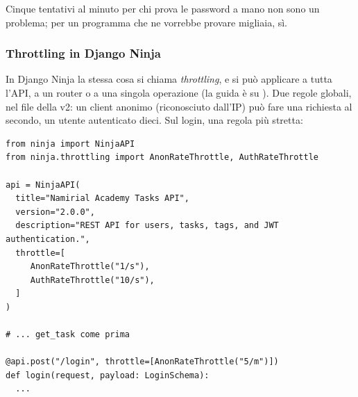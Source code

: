 Cinque tentativi al minuto per chi prova le password a mano non sono un
problema; per un programma che ne vorrebbe provare migliaia, sì.

\subsubsection{Throttling in Django Ninja}

In Django Ninja la stessa cosa si chiama \textit{throttling}, e si può
applicare a tutta l'API, a un router o a una singola operazione (la guida è su
). Due regole globali, nel
file della v2: un client anonimo (riconosciuto dall'IP) può fare una richiesta
al secondo, un utente autenticato dieci. Sul login, una regola più stretta:

\begin{affianco}[0.55]
\codicepiccolo
\begin{lstlisting}[style=python, name=tasks/api_v2.py]
from ninja import NinjaAPI
from ninja.throttling import AnonRateThrottle, AuthRateThrottle

api = NinjaAPI(
  title="Namirial Academy Tasks API",
  version="2.0.0",
  description="REST API for users, tasks, tags, and JWT authentication.",
  throttle=[
     AnonRateThrottle("1/s"),
     AuthRateThrottle("10/s"),
  ]
)

# ... get_task come prima

@api.post("/login", throttle=[AnonRateThrottle("5/m")])
def login(request, payload: LoginSchema):
  ...
\end{lstlisting}
\risultato
{}
\end{affianco}

